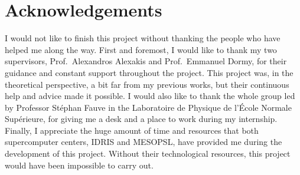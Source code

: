 \documentclass[../main.tex]{subfiles}
\begin{document}
\section*{Acknowledgements}
I would not like to finish this project without thanking the people who have helped me along the way. First and foremost, I would like to thank my two supervisors, Prof.\ Alexandros Alexakis and Prof.\ Emmanuel Dormy, for their guidance and constant support throughout the project. This project was, in the theoretical perspective, a bit far from my previous works, but their continuous help and advice made it possible. I would also like to thank the whole group led by Professor Stéphan Fauve in the Laboratoire de Physique de l'École Normale Supérieure, for giving me a desk and a place to work during my internship. Finally, I appreciate the huge amount of time and resources that both supercomputer centers, IDRIS and MESOPSL, have provided me during the development of this project. Without their technological resources, this project would have been impossible to carry out.
\end{document}
